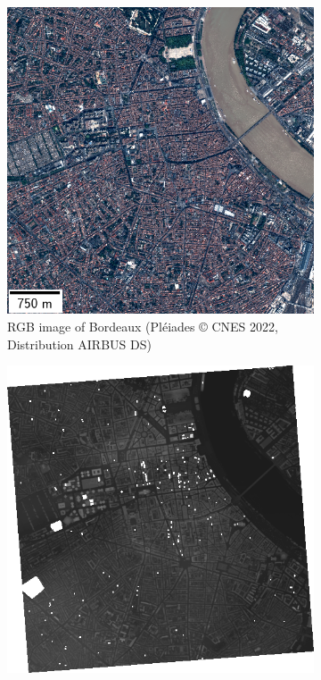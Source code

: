 \begin{figure}
    \centering
    \begin{subfigure}[t]{0.48\linewidth}
        \flushleft
        \includegraphics[width=\linewidth]{Images/Chap_6/miniature_Bordeaux.png}
        \caption{RGB image of Bordeaux (Pléiades © CNES 2022, Distribution AIRBUS DS)}
        \label{fig:miniature_Bordeaux_rgb}
    \end{subfigure}\hfill
    \begin{subfigure}[t]{0.48\linewidth}
        \flushright
        \includegraphics[width=\linewidth]{Images/Chap_6/miniature_Bordeaux_gt.png}

\end{subfigure}
\end{figure}
